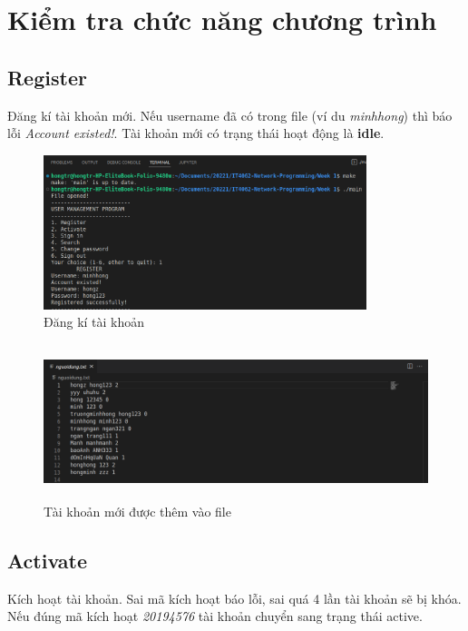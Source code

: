 \documentclass[12pt]{article}
\begin{document}
\section{Kiểm tra chức năng chương trình}
\subsection{Register}
Đăng kí tài khoản mới. Nếu username đã có trong file (ví du \textit{minhhong}) thì báo lỗi \textit{Account existed!}. Tài khoản mới có trạng thái hoạt động là \textbf{idle}.
\begin{figure}[h]
    \begin{center}
        \includegraphics[width=0.8\linewidth, height=4.5cm]{Img/1_chay.png}
    \end{center}
    \caption{Đăng kí tài khoản}
    \label{fig:1_chay}
\end{figure}
\begin{figure}[h]
    \begin{center}
        \includegraphics[width=0.8\linewidth, height=4.5cm]{Img/1_data.png}
    \end{center}
    \caption{Tài khoản mới được thêm vào file}
    \label{fig:1_file}
\end{figure}

\subsection{Activate}
Kích hoạt tài khoản. Sai mã kích hoạt báo lỗi, sai quá 4 lần tài khoản sẽ bị khóa. \linebreak Nếu đúng mã kích hoạt \textit{20194576} tài khoản chuyển sang trạng thái active.
\end{document}
